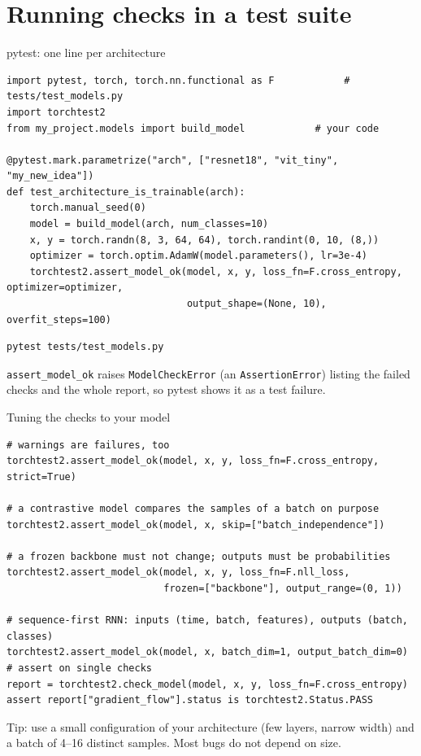 \documentclass[aspectratio=169,11pt]{beamer}
\begin{document}
\section{Running checks in a test suite}

\begin{frame}[fragile]{pytest: one line per architecture}
  \begin{lstlisting}
import pytest, torch, torch.nn.functional as F            # tests/test_models.py
import torchtest2
from my_project.models import build_model            # your code

@pytest.mark.parametrize("arch", ["resnet18", "vit_tiny", "my_new_idea"])
def test_architecture_is_trainable(arch):
    torch.manual_seed(0)
    model = build_model(arch, num_classes=10)
    x, y = torch.randn(8, 3, 64, 64), torch.randint(0, 10, (8,))
    optimizer = torch.optim.AdamW(model.parameters(), lr=3e-4)
    torchtest2.assert_model_ok(model, x, y, loss_fn=F.cross_entropy, optimizer=optimizer,
                               output_shape=(None, 10), overfit_steps=100)
  \end{lstlisting}
  \begin{lstlisting}[style=shell]
pytest tests/test_models.py
  \end{lstlisting}
  \small \texttt{assert\_model\_ok} raises \texttt{ModelCheckError} (an \texttt{AssertionError})
  listing the failed checks and the whole report, so pytest shows it as a test failure.
\end{frame}

\begin{frame}[fragile]{Tuning the checks to your model}
  \begin{lstlisting}
# warnings are failures, too
torchtest2.assert_model_ok(model, x, y, loss_fn=F.cross_entropy, strict=True)

# a contrastive model compares the samples of a batch on purpose
torchtest2.assert_model_ok(model, x, skip=["batch_independence"])

# a frozen backbone must not change; outputs must be probabilities
torchtest2.assert_model_ok(model, x, y, loss_fn=F.nll_loss,
                           frozen=["backbone"], output_range=(0, 1))

# sequence-first RNN: inputs (time, batch, features), outputs (batch, classes)
torchtest2.assert_model_ok(model, x, batch_dim=1, output_batch_dim=0)
# assert on single checks
report = torchtest2.check_model(model, x, y, loss_fn=F.cross_entropy)
assert report["gradient_flow"].status is torchtest2.Status.PASS
  \end{lstlisting}
  \small Tip: use a \alert{small configuration} of your architecture (few layers, narrow width)
  and a batch of 4--16 distinct samples. Most bugs do not depend on size.
\end{frame}
\end{document}
